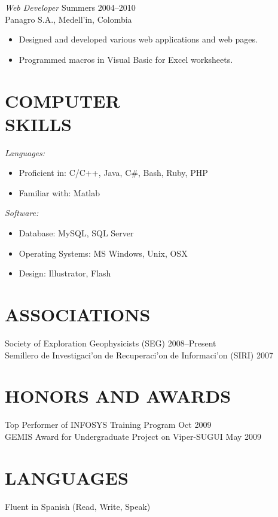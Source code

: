 \documentclass[line,margin]{res}
\begin{document}
\begin{resume}
{\sl Web Developer} \hfill Summers  2004--2010\\
Panagro S.A., Medell\a'in, Colombia
\begin{itemize} \itemsep -2pt
    \item Designed and developed various web applications and web pages.  
    \item Programmed macros in Visual Basic for Excel worksheets.
\end{itemize}

 
\section{COMPUTER \\ SKILLS} %
\label{sec:computer_skills}
    {\sl Languages:}
    \begin{itemize} \itemsep -2pt
        \item Proficient in: C/C++, Java, C\#, Bash, Ruby, PHP
        \item Familiar with: Matlab
    \end{itemize}

    {\sl Software:}
    \begin{itemize} \itemsep -2pt
        \item Database: MySQL, SQL Server
        \item Operating Systems: MS Windows, Unix, OSX
        \item Design: Illustrator, Flash
    \end{itemize} 

\section{ASSOCIATIONS} %
\label{sec:associations}
    Society of Exploration Geophysicists (SEG) \hfill 2008--Present\\
    Semillero de Investigaci\a'on de Recuperaci\a'on de Informaci\a'on (SIRI) \hfill 2007\\

\section{HONORS AND AWARDS} %
\label{sec:honors_and_awards}
    Top Performer of INFOSYS Training Program \hfill Oct 2009\\
    GEMIS Award for Undergraduate Project on Viper-SUGUI \hfill May 2009\\

\section{LANGUAGES} %
\label{sec:languages}
    Fluent in Spanish (Read, Write, Speak)

\end{resume}
\end{document}
